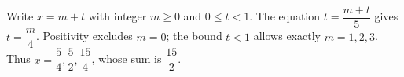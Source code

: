 Write $x=m+t$ with integer $m\ge0$ and $0\le t<1$. The equation $t=\dfrac{m+t}{5}$ gives $t=\dfrac{m}{4}$. Positivity excludes $m=0$; the bound $t<1$ allows exactly $m=1,2,3$. Thus $x=\dfrac{5}{4},\dfrac{5}{2},\dfrac{15}{4}$, whose sum is $\boxed{\dfrac{15}{2}}$.
